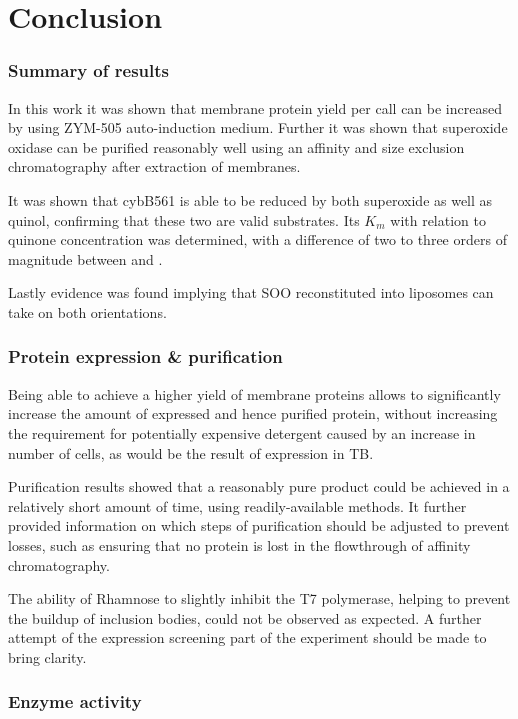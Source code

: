 \part{Conclusion}

\section{Summary of results}

In this work it was shown that membrane protein yield per call can be increased
by using ZYM-505 auto-induction medium. Further it was shown that superoxide
oxidase can be purified reasonably well using an affinity and size exclusion
chromatography after extraction of membranes.

It was shown that cybB561 is able to be reduced by both superoxide as well as
quinol, confirming that these two are valid substrates. Its $K_m$ with relation
to quinone concentration was determined, with a difference of two to three
orders of magnitude between \hs{} and \hsmut{}.

Lastly evidence was found implying that SOO reconstituted into liposomes can
take on both orientations.

\section{Protein expression \& purification}

Being able to achieve a higher yield of membrane proteins allows to
significantly increase the amount of expressed and hence purified protein,
without increasing the requirement for potentially expensive detergent caused
by an increase in number of cells, as would be the result of expression in
TB.\cite{memstar}

Purification results showed that a reasonably pure product could be achieved in
a relatively short amount of time, using readily-available methods. It further
provided information on which steps of purification should be adjusted to
prevent losses, such as ensuring that no protein is lost in the flowthrough of
affinity chromatography.

The ability of Rhamnose to slightly inhibit the T7 polymerase, helping to
prevent the buildup of inclusion bodies, could not be observed as expected. A
further attempt of the expression screening part of the experiment should be
made to bring clarity.
\section{Enzyme activity}

